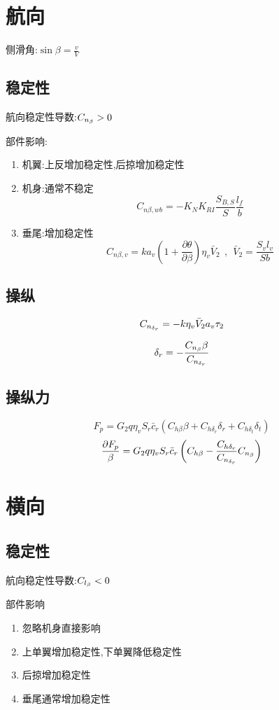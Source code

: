 \section{航向}
侧滑角:$\displaystyle\sin \beta=\frac{v}{V}$
\subsection{稳定性}
航向稳定性导数:$C_{n_\beta}>0$

部件影响:
\begin{enumerate}[label=\arabic*.,topsep=0pt]
\setlength{\itemsep}{-2pt}
\item 机翼:上反增加稳定性,后掠增加稳定性
\item 机身:通常不稳定
$$C_{n\beta,wb}=-K_NK_{RI}\frac{S_{B,S}}{S}\frac{l_f}{b}$$
\item 垂尾:增加稳定性
$$C_{n\beta,v}=k a_v\left(1+\frac{\partial \theta}{\partial \beta}\right)\eta_v \bar{V}_2\ \ ,\ \ \bar{V}_2=\frac{S_vl_v}{Sb}$$
\end{enumerate}

\subsection{操纵}
$$C_{n_{\delta_r}}=-k\eta_v\bar{V}_2a_v\tau_2$$

$$\delta_r=-\frac{C_{n_\beta} \beta}{C_{n_{\delta_r}}}$$

\subsection{操纵力}
$$F_p=G_2q\eta_vS_r\bar{c}_r(C_{h\beta}\beta+C_{h\delta_r}\delta_r+C_{h\delta_t}\delta_t)$$
$$\frac{\partial F_p}{\beta}=G_2q\eta_vS_r\bar{c}_r\left( C_{h\beta}-\frac{C_{h\delta_r}}{C_{n_{\delta_r}}}C_{n_\beta}\right)$$

\section{横向}
\subsection{稳定性}
航向稳定性导数:$C_{l_\beta}<0$

部件影响
\begin{enumerate}[label=\arabic*.,topsep=0pt]
\setlength{\itemsep}{-2pt}
\item 忽略机身直接影响
\item 上单翼增加稳定性,下单翼降低稳定性
\item 后掠增加稳定性
\item 垂尾通常增加稳定性

\end{enumerate}

\endinput
